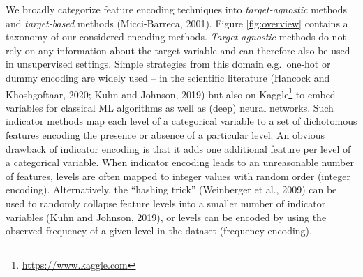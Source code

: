 \documentclass[smallextended]{svjour3}       %
\begin{document}
We broadly categorize feature encoding techniques into \emph{target-agnostic} methods and \emph{target-based} methods (Micci-Barreca, 2001).
Figure \ref{fig:overview} contains a taxonomy of our considered encoding methods. \emph{Target-agnostic} methods do not rely on any information about the target variable and can therefore also be used in unsupervised settings.
Simple strategies from this domain e.g.~one-hot or dummy encoding are widely used -- in the scientific literature (Hancock and Khoshgoftaar, 2020; Kuhn and Johnson, 2019) but also on Kaggle\footnote{\url{https://www.kaggle.com}} to embed variables for classical ML algorithms as well as (deep) neural networks.
Such indicator methods map each level of a categorical variable to a set of dichotomous features encoding the presence or absence of a particular level.
An obvious drawback of indicator encoding is that it adds one additional feature per level of a categorical variable.
When indicator encoding leads to an unreasonable number of features, levels are often mapped to integer values with random order (integer encoding). Alternatively, the ``hashing trick'' (Weinberger et al., 2009) can be used to randomly collapse feature levels into a smaller number of indicator variables (Kuhn and Johnson, 2019), or levels can be encoded by using the observed frequency of a given level in the dataset (frequency encoding).
\end{document}
